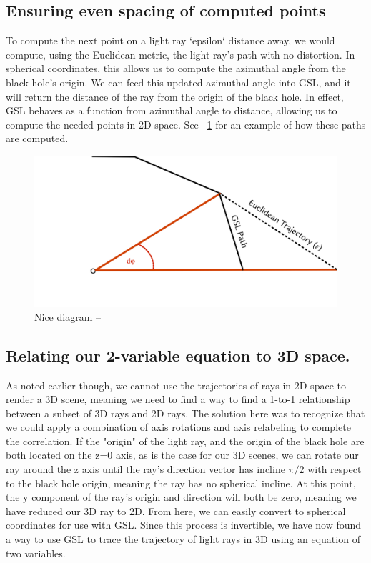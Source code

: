 \subsection{Ensuring even spacing of computed points}
To compute the next point on a light ray `epsilon` distance away, we would compute, using the Euclidean metric, the light ray's path with no distortion. In spherical coordinates, this allows us to compute the azimuthal angle from the black hole's origin. We can feed this updated azimuthal angle into GSL, and it will return the distance of the ray from the origin of the black hole. In effect, GSL behaves as a function from azimuthal angle to distance, allowing us to compute the needed points in 2D space. See ~\ref{fig:one} for an example of how these paths are computed.

\begin{figure}[h]
  \centering
  \includegraphics[width=.65\linewidth]{figs/nextpoint}
  \caption{Nice diagram -- }
  \label{fig:one}
\end{figure}


\subsection{Relating our 2-variable equation to 3D space.}
As noted earlier though, we cannot use the trajectories of rays in 2D space to render a 3D scene, meaning we need to find a way to find a 1-to-1 relationship between a subset of 3D rays and 2D rays. The solution here was to recognize that we could apply a combination of axis rotations and axis relabeling to complete the correlation. If the "origin" of the light ray, and the origin of the black hole are both located on the z=0 axis, as is the case for our 3D scenes, we can rotate our ray around the z axis until the ray's direction vector has incline $ \pi / 2 $ with respect to the black hole origin, meaning the ray has no spherical incline. At this point, the y component of the ray's origin and direction will both be zero, meaning we have reduced our 3D ray to 2D. From here, we can easily convert to spherical coordinates for use with GSL. Since this process is invertible, we have now found a way to use GSL to trace the trajectory of light rays in 3D using an equation of two variables.


